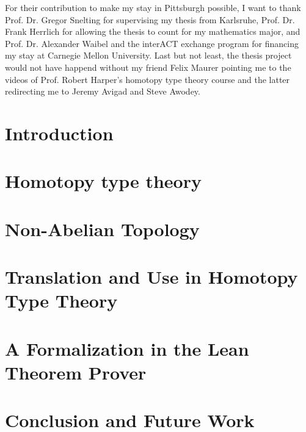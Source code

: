 \documentclass[12pt,headings=optiontohead]{book}
\theoremstyle{definition}
\begin{document}
For their contribution to make my stay in Pittsburgh possible, I want to thank
Prof. Dr. Gregor Snelting for supervising my thesis from Karlsruhe,
Prof. Dr. Frank Herrlich for allowing the thesis to count for my mathematics major,
and Prof. Dr. Alexander Waibel and the interACT exchange program for financing my
stay at Carnegie Mellon University.
Last but not least, the thesis project would not have happend without my friend
Felix Maurer pointing me to the videos of Prof. Robert Harper's homotopy type
theory course and the latter redirecting me to Jeremy Avigad and Steve Awodey.

\clearpage

\tableofcontents
\mainmatter

\chapter{Introduction} \label{chapter:intro}



\chapter{Homotopy type theory} \label{chapter:hott}



\chapter{Non-Abelian Topology} \label{chapter:nat}

 

\chapter{Translation and Use in Homotopy Type Theory} \label{chapter:types}



\chapter{A Formalization in the Lean Theorem Prover} \label{chapter:lean}



\chapter{Conclusion and Future Work} \label{chapter:outro}






\appendix



\end{document}

